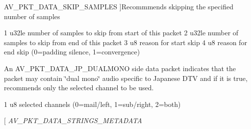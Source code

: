 \begin{Desc}
\begin{description}
{A\+V\+\_\+\+P\+K\+T\+\_\+\+D\+A\+T\+A\+\_\+\+S\+K\+I\+P\+\_\+\+S\+A\+M\+P\+L\+ES\hypertarget{group__lavc__packet_gga9a80bfcacc586b483a973272800edb97a2093332d8086d25a04942ede61007f6a}{}\label{group__lavc__packet_gga9a80bfcacc586b483a973272800edb97a2093332d8086d25a04942ede61007f6a}
}]Recommmends skipping the specified number of samples 
\begin{DoxyCode}
1 u32le number of samples to skip from start of this packet
2 u32le number of samples to skip from end of this packet
3 u8    reason for start skip
4 u8    reason for end   skip (0=padding silence, 1=convergence)
\end{DoxyCode}
 \item[{\em 
A\+V\+\_\+\+P\+K\+T\+\_\+\+D\+A\+T\+A\+\_\+\+J\+P\+\_\+\+D\+U\+A\+L\+M\+O\+NO\hypertarget{group__lavc__packet_gga9a80bfcacc586b483a973272800edb97a0933bb1f539acca421bfaa293cb3ee95}{}\label{group__lavc__packet_gga9a80bfcacc586b483a973272800edb97a0933bb1f539acca421bfaa293cb3ee95}
}]An A\+V\+\_\+\+P\+K\+T\+\_\+\+D\+A\+T\+A\+\_\+\+J\+P\+\_\+\+D\+U\+A\+L\+M\+O\+NO side data packet indicates that the packet may contain \char`\"{}dual mono\char`\"{} audio specific to Japanese D\+TV and if it is true, recommends only the selected channel to be used. 
\begin{DoxyCode}
1 u8    selected channels (0=mail/left, 1=sub/right, 2=both)
\end{DoxyCode}
 \item[{\em 
A\+V\+\_\+\+P\+K\+T\+\_\+\+D\+A\+T\+A\+\_\+\+S\+T\+R\+I\+N\+G\+S\+\_\+\+M\+E\+T\+A\+D\+A\+TA\hypertarget{group__lavc__packet_gga9a80bfcacc586b483a973272800edb97a18d2e9d2c572fbe22a5880176fc41e9a}{}\label{group__lavc__packet_gga9a80bfcacc586b483a973272800edb97a18d2e9d2c572fbe22a5880176fc41e9a}
}
\end{description}
\end{Desc}
